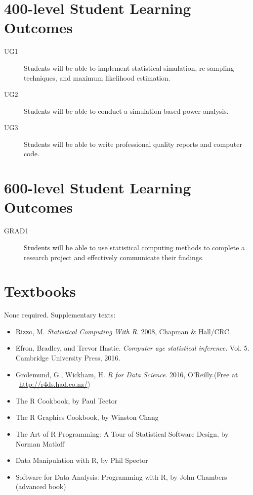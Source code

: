 \documentclass[11pt,onecolumn]{article}
\begin{document}
\section*{400-level Student Learning Outcomes}
\begin{description}
\item[UG1] Students will be able to implement statistical simulation, re-sampling techniques, and maximum likelihood estimation. 
\item[UG2] Students will be able to conduct a simulation-based power analysis. 
\item[UG3] Students will be able to write professional quality reports and computer code.
\end{description}

\section*{600-level Student Learning Outcomes}
\begin{description}
\item[GRAD1] Students will be able to use statistical computing methods to complete a research project and effectively communicate their findings.
\end{description}

\clearpage
\section*{Textbooks}
None required. Supplementary texts:
\begin{itemize} 
\item Rizzo, M. \emph{Statistical Computing With R}. 2008, Chapman \& Hall/CRC.
\item Efron, Bradley, and Trevor Hastie. \textit{Computer age statistical inference}. Vol. 5. Cambridge University Press, 2016.
  \item Grolemund, G., Wickham, H. \emph{R for Data Science}. 2016, O’Reilly.(Free at ~\url{http://r4ds.had.co.nz/})
\item The R Cookbook, by Paul Teetor
\item The R Graphics Cookbook, by Winston Chang
\item The Art of R Programming: A Tour of Statistical Software Design, by Norman Matloff
\item Data Manipulation with R, by Phil Spector
    \item Software for Data Analysis: Programming with R, by John Chambers (advanced book)
\end{itemize}
\end{document}
